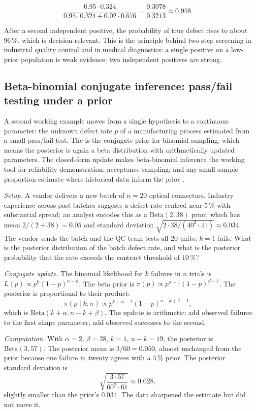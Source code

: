 \[
\frac{0.95 \cdot 0.324}{0.95 \cdot 0.324 + 0.02 \cdot 0.676}
= \frac{0.3078}{0.3213} \approx 0.958.
\]

After a second independent positive, the probability of true defect
rises to about $96 \,\%$, which is decision-relevant. This is the
principle behind two-step screening in industrial quality control
and in medical diagnostics: a single positive on a low-prior
population is weak evidence; two independent positives are strong.

\subsection{Beta-binomial conjugate inference: pass/fail testing
under a prior}

A second working example moves from a single hypothesis to a
continuous parameter: the unknown defect rate $p$ of a manufacturing
process estimated from a small pass/fail test. The
 is the conjugate prior for binomial
sampling, which means the posterior is again a beta distribution
with arithmetically updated parameters. The closed-form update
makes beta-binomial inference the working tool for reliability
demonstration, acceptance sampling, and any small-sample
proportion estimate where historical data inform the prior
\cite[ch.~2]{text:ch08-gelman-bda3-2013}.

\textit{Setup.} A vendor delivers a new batch of $n = 20$ optical
connectors. Industry experience across past batches suggests a
defect rate centred near $5 \,\%$ with substantial spread; an
analyst encodes this as a $\text{Beta}(2, 38)$ prior, which has
mean $2/(2 + 38) = 0.05$ and standard deviation
$\sqrt{2 \cdot 38/(40^{2} \cdot 41)} \approx 0.034$. The vendor
sends the batch and the QC team tests all $20$ units; $k = 1$
fails. What is the posterior distribution of the batch defect
rate, and what is the posterior probability that the rate exceeds
the contract threshold of $10 \,\%$?

\textit{Conjugate update.} The binomial likelihood for $k$ failures
in $n$ trials is
$L(p) \propto p^{k} (1 - p)^{n - k}$. The beta prior is
$\pi(p) \propto p^{\alpha - 1} (1 - p)^{\beta - 1}$. The posterior
is proportional to their product:
\[
\pi(p \mid k, n) \propto p^{k + \alpha - 1} (1 - p)^{n - k + \beta - 1},
\]
which is $\text{Beta}(k + \alpha, n - k + \beta)$. The update is
arithmetic: add observed failures to the first shape parameter,
add observed successes to the second.

\textit{Computation.} With $\alpha = 2$, $\beta = 38$, $k = 1$,
$n - k = 19$, the posterior is $\text{Beta}(3, 57)$. The
posterior mean is $3/60 = 0.050$, almost unchanged from the
prior because one failure in twenty agrees with a $5 \,\%$ prior.
The posterior standard deviation is
\[
\sqrt{\frac{3 \cdot 57}{60^{2} \cdot 61}} \approx 0.028,
\]
slightly smaller than the prior's $0.034$. The data sharpened the
estimate but did not move it.

